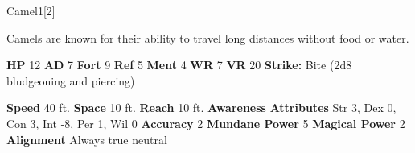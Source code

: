   \begin{monsection}{Camel}{1}[2]
    \vspace{-1em}\vspace{-1em}
    \vspace{0em}

    
        Camels are known for their ability to travel long distances without food or water.
      

    \begin{spellcontent}
      \begin{spelltargetinginfo}
        \pari \textbf{HP} 12 \monsep
          \textbf{AD} 7 \monsep
          \textbf{Fort} 9 \monsep
          \textbf{Ref} 5 \monsep
          \textbf{Ment} 4
        \pari \textbf{WR} 7 \monsep
        \textbf{VR} 20
        \pari \textbf{Strike:}
            Bite  (2d8 bludgeoning and piercing)
      \end{spelltargetinginfo}
    \end{spellcontent}
    \begin{monsterfooter}
      \pari \textbf{Speed} 40 ft. \monsep
        \textbf{Space} 10 ft. \monsep
        \textbf{Reach} 10 ft.
      \pari \textbf{Awareness} 
      \pari \textbf{Attributes}
        Str 3, Dex 0,
        Con 3, Int -8,
        Per 1, Wil 0
      \pari \textbf{Accuracy} 2 \monsep
        \textbf{Mundane Power} 5 \monsep
      \textbf{Magical Power} 2
      \pari \textbf{Alignment} Always true neutral
    \end{monsterfooter}
  \end{monsection}
  
